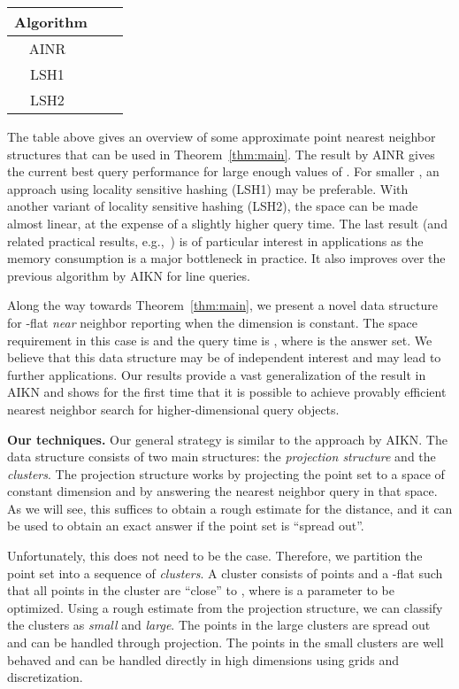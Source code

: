 \documentclass[a4paper,11pt]{paper}
\begin{document}
\begin{center}
\begin{tabular}{|c|c|c|}
  \hline
  Algorithm &  & \\
  \hline
  AINR~\cite{AndoniInNgRa14} & &
   \\
  LSH1~\cite[Theorem~3.2.1]{Andoni09} &  & \\
  LSH2~\cite[Theorem~3.4.1]{Andoni09} &  & \\
  \hline
\end{tabular}
\end{center}
The table above gives an overview of
some approximate point nearest neighbor structures
that can be used in Theorem~\ref{thm:main}.
The result by AINR gives the current best query performance for large
enough values of . For smaller , an approach
using locality sensitive hashing (LSH1) may be preferable.
With another variant of locality sensitive hashing (LSH2),
the space can be made almost linear, at the expense of a slightly
higher query time. The last result (and related practical
results, e.g.,~\cite{LvJoWaChLi07}) is of particular
interest in applications as the memory consumption is a major bottleneck in practice. It also improves
over the previous algorithm by AIKN for line queries.

Along the way towards Theorem~\ref{thm:main},
we present a novel data structure for
-flat \emph{near} neighbor reporting when the dimension  is
constant. The space requirement in this case is
 and the query time is
, where  is the answer set.
We believe that this data structure may be of independent
interest and may lead to further applications.
Our results provide a vast generalization of the result in  AIKN
and shows for the first time
that it is possible to achieve provably efficient
nearest neighbor search for higher-dimensional query objects.


\noindent
\textbf{Our techniques.}
Our general strategy is similar to the approach by AIKN.
The data structure  consists of two  main structures: the
\emph{projection structure} and the \emph{clusters}.
The projection structure works by projecting the point set
to a space of constant dimension and by answering the nearest
neighbor query in that space. As we will see, this suffices
to obtain a rough estimate for the distance, and it can be
used to obtain an exact answer if the point set is ``spread
out''.

Unfortunately, this does not need to be the case.
Therefore, we partition the point set into a sequence
of \emph{clusters}.
A cluster consists of  points and a -flat 
such that all points in the cluster are ``close'' to ,
where  is a parameter to be optimized.
Using a rough estimate from the projection structure, we can
classify the clusters as \emph{small} and \emph{large}.
The points in the large clusters are spread out and
can be handled through projection. The points in the small
clusters are well behaved and can be handled directly
in high dimensions using grids and discretization.
\end{document}
